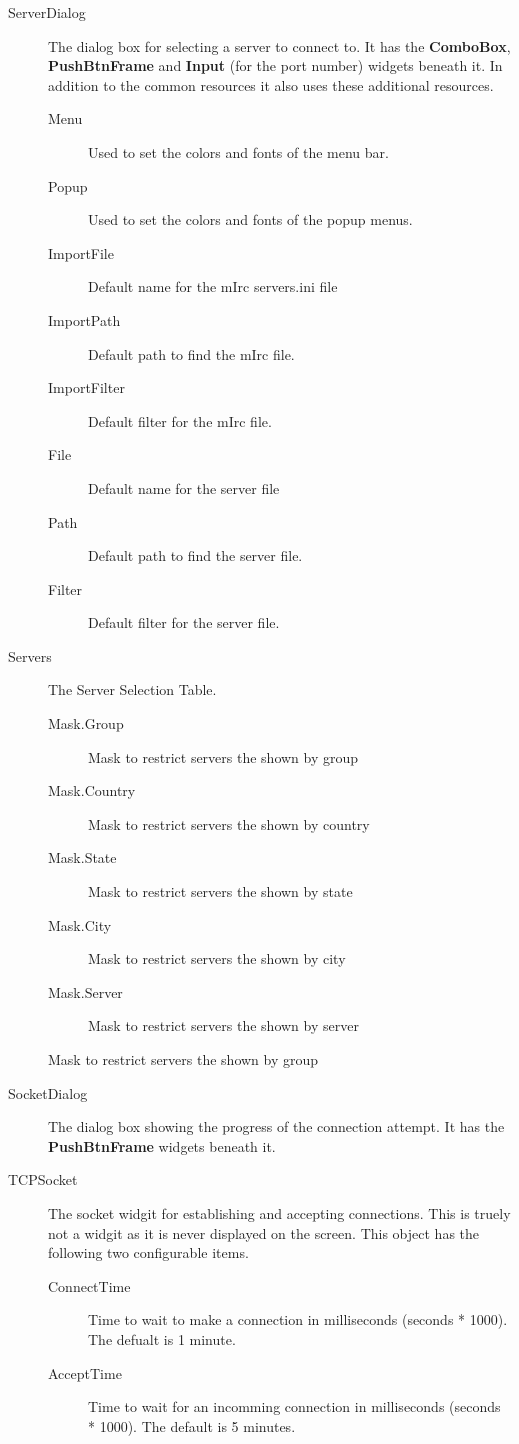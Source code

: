 \documentclass[titlepage]{article}
\begin{document}
\begin{description}
\item[ServerDialog] The dialog box for selecting a server to connect
to. It has the \textbf{ComboBox}, \textbf{PushBtnFrame} and
\textbf{Input} (for the port number) widgets beneath it. In addition to the
common resources it also uses these additional resources.
\begin{description}
\item[Menu] Used to set the colors and fonts of the menu bar.
\item[Popup] Used to set the colors and fonts of the popup menus.
\item[ImportFile] Default name for the mIrc servers.ini file
\item[ImportPath] Default path to find the mIrc file.
\item[ImportFilter] Default filter for the mIrc file.
\item[File] Default name for the server file
\item[Path] Default path to find the server file.
\item[Filter] Default filter for the server file.
\end{description}

\item[Servers] The Server Selection Table.
\begin{description}
\item[Mask.Group] Mask to restrict servers the shown by group
\item[Mask.Country] Mask to restrict servers the shown by country
\item[Mask.State] Mask to restrict servers the shown by state
\item[Mask.City] Mask to restrict servers the shown by city
\item[Mask.Server] Mask to restrict servers the shown by server
\end{description} Mask to restrict servers the shown by group

\item[SocketDialog] The dialog box showing the progress of the
connection attempt. It has the \textbf{PushBtnFrame} widgets beneath it.

\item[TCPSocket] The socket widgit for establishing and accepting
connections. This is truely not a widgit as it is never displayed on
the screen. This object has the following two configurable items.
\begin{description}
\item[ConnectTime] Time to wait to make a connection in milliseconds
(seconds * 1000). The defualt is 1 minute.
\item[AcceptTime] Time to wait for an incomming connection in
milliseconds (seconds * 1000). The default is 5 minutes.
\end{description}

\end{description}
\end{document}
